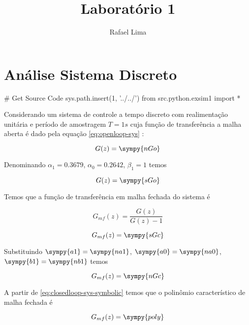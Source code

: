 \documentclass[a4paper,11pt]{article}
\title{Laboratório 1} %
\author{Rafael Lima}
\begin{document}

\section{Análise Sistema Discreto}

\begin{sympycode}
# Get Source Code
sys.path.insert(1, '../../')
from src.python.exsim1 import *
\end{sympycode}

Considerando um sistema de controle a tempo discreto com realimentação unitária e período de amostragem $T = 1s$ cuja função de transferência a malha aberta é dado pela equação \ref{eq:openloop-sys} :

\begin{equation}\label{eq:openloop-sys}
    G(z) = \sympy{nGo}
\end{equation}

Denominando $\alpha_1 = 0.3679$, $\alpha_0 = 0.2642$, $\beta_1 = 1$ temos

\begin{equation}\label{eq:openloop-sys-symbolic}
    G(z) = \sympy{sGo}
\end{equation}

Temos que a função de transferência em malha fechada do sistema é

$$G_{mf}(z) = \frac{G(z)}{G(z) - 1}$$

\begin{equation}\label{eq:closedloop-sys-symbolic}
    G_{mf}(z) = \sympy{sGc}
\end{equation}

Substituindo $\sympy{a1} = \sympy{na1}$, $\sympy{a0} = \sympy{na0}$, $\sympy{b1} = \sympy{nb1}$ temos

\begin{equation}\label{eq:closedloop-sys}
    G_{mf}(z) = \sympy{nGc}
\end{equation}

A partir de \ref{eq:closedloop-sys-symbolic} temos que o polinômio característico de malha fechada é

\begin{equation}\label{eq:poly-sys-symbolic}
    G_{mf}(z) = \sympy{poly}
\end{equation}
\end{document}
